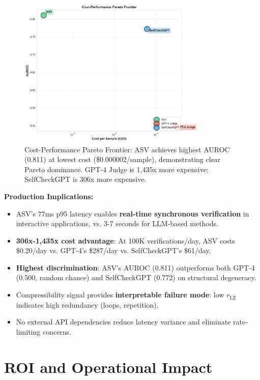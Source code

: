 \documentclass[11pt]{article}
\begin{document}
\begin{figure}[h]
\centering
\includegraphics[width=0.8\textwidth]{figures/baseline_cost_performance.png}
\caption{Cost-Performance Pareto Frontier: ASV achieves highest AUROC (0.811) at lowest cost (\$0.000002/sample), demonstrating clear Pareto dominance. GPT-4 Judge is 1,435x more expensive; SelfCheckGPT is 306x more expensive.}
\label{fig:baseline-cost-performance}
\end{figure}

\textbf{Production Implications:}
\begin{itemize}
\item ASV's 77ms p95 latency enables \textbf{real-time synchronous verification} in interactive applications, vs. 3-7 seconds for LLM-based methods.
\item \textbf{306x-1,435x cost advantage}: At 100K verifications/day, ASV costs \$0.20/day vs. GPT-4's \$287/day vs. SelfCheckGPT's \$61/day.
\item \textbf{Highest discrimination}: ASV's AUROC (0.811) outperforms both GPT-4 (0.500, random chance) and SelfCheckGPT (0.772) on structural degeneracy.
\item Compressibility signal provides \textbf{interpretable failure mode}: low $r_{\text{LZ}}$ indicates high redundancy (loops, repetition).
\item No external API dependencies reduce latency variance and eliminate rate-limiting concerns.
\end{itemize}

\section{ROI and Operational Impact}
\label{sec:roi}
\end{document}
